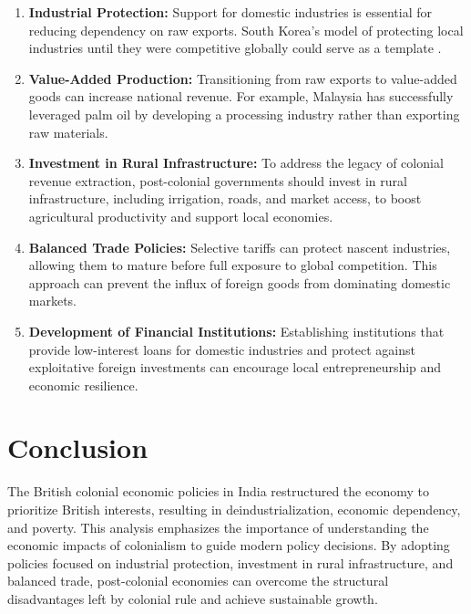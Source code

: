 \documentclass[9pt,twocolumn,twoside]{opticajnl}
\begin{document}
\begin{enumerate}
    \item \textbf{Industrial Protection:} Support for domestic industries is essential for reducing dependency on raw exports. South Korea’s model of protecting local industries until they were competitive globally could serve as a template \cite{chang2007bad}.
    
    \item \textbf{Value-Added Production:} Transitioning from raw exports to value-added goods can increase national revenue. For example, Malaysia has successfully leveraged palm oil by developing a processing industry rather than exporting raw materials.
    
    \item \textbf{Investment in Rural Infrastructure:} To address the legacy of colonial revenue extraction, post-colonial governments should invest in rural infrastructure, including irrigation, roads, and market access, to boost agricultural productivity and support local economies.
    
    \item \textbf{Balanced Trade Policies:} Selective tariffs can protect nascent industries, allowing them to mature before full exposure to global competition. This approach can prevent the influx of foreign goods from dominating domestic markets.
    
    \item \textbf{Development of Financial Institutions:} Establishing institutions that provide low-interest loans for domestic industries and protect against exploitative foreign investments can encourage local entrepreneurship and economic resilience.
\end{enumerate}

\section{Conclusion}
The British colonial economic policies in India restructured the economy to prioritize British interests, resulting in deindustrialization, economic dependency, and poverty. This analysis emphasizes the importance of understanding the economic impacts of colonialism to guide modern policy decisions. By adopting policies focused on industrial protection, investment in rural infrastructure, and balanced trade, post-colonial economies can overcome the structural disadvantages left by colonial rule and achieve sustainable growth.
\end{document}
